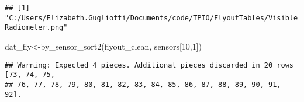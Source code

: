 \documentclass[
]{article}
\newenvironment{Shaded}{\begin{snugshade}}{\end{snugshade}}
\newcommand{\DecValTok}[1]{\textcolor[rgb]{0.00,0.00,0.81}{#1}}
\newcommand{\FunctionTok}[1]{\textcolor[rgb]{0.00,0.00,0.00}{#1}}
\newcommand{\NormalTok}[1]{#1}
\newcommand{\OtherTok}[1]{\textcolor[rgb]{0.56,0.35,0.01}{#1}}
\begin{document}
\begin{verbatim}
## [1] "C:/Users/Elizabeth.Gugliotti/Documents/code/TPIO/FlyoutTables/Visible_UV Radiometer.png"
\end{verbatim}

\begin{Shaded}
\begin{Highlighting}[]
\NormalTok{dat\_fly}\OtherTok{\textless{}{-}}\FunctionTok{by\_sensor\_sort2}\NormalTok{(flyout\_clean, sensors[}\DecValTok{10}\NormalTok{,}\DecValTok{1}\NormalTok{])}
\end{Highlighting}
\end{Shaded}

\begin{verbatim}
## Warning: Expected 4 pieces. Additional pieces discarded in 20 rows [73, 74, 75,
## 76, 77, 78, 79, 80, 81, 82, 83, 84, 85, 86, 87, 88, 89, 90, 91, 92].
\end{verbatim}
\end{document}
